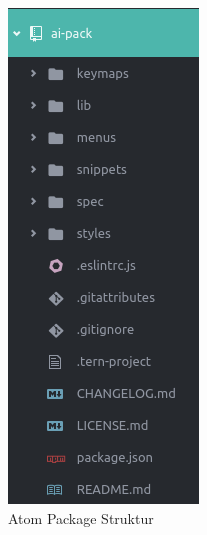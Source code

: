         \begin{figure}[H]
            \centering
                \includegraphics[scale=0.5]{img/package_structure.png}
                \caption{Atom Package Struktur}
        \end{figure}

